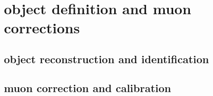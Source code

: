 \chapter{object definition and muon corrections}

\section{object reconstruction and identification}\label{sec:obj_sel}

\section{muon correction and calibration}